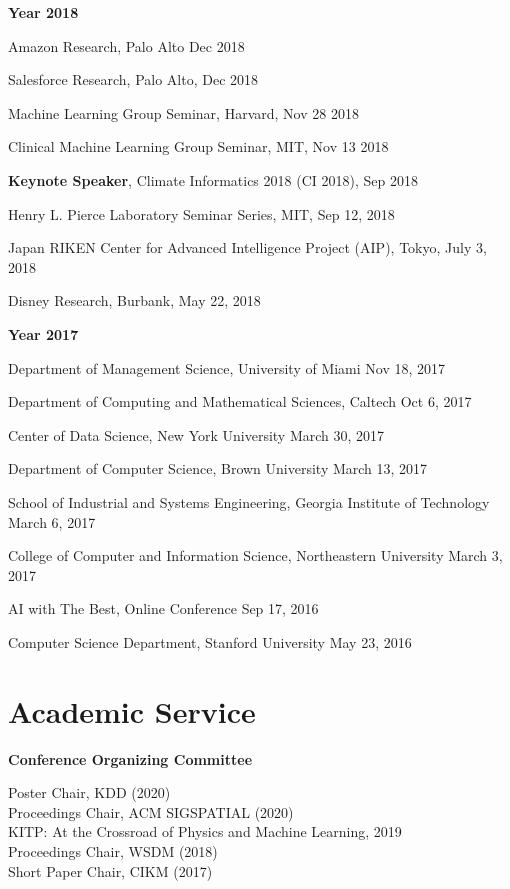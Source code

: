 \documentclass[margin,line]{res}
\begin{document}
\begin{resume}
 {\bf Year  2018}
 
Amazon Research, Palo Alto \hfill{Dec 2018}

Salesforce Research, Palo Alto, \hfill{Dec 2018}

Machine Learning Group Seminar, Harvard, \hfill {Nov 28 2018} 

Clinical Machine Learning Group Seminar, MIT, \hfill {Nov 13  2018} 


\textbf{Keynote Speaker},  Climate Informatics 2018 (CI 2018), \hfill {Sep 2018} 


Henry L. Pierce Laboratory Seminar Series, MIT, \hfill {Sep 12, 2018}

Japan RIKEN  Center for Advanced Intelligence Project (AIP), Tokyo, \hfill {July 3, 2018}

Disney Research, Burbank, \hfill {May 22, 2018}

 {\bf Year  2017}
 
Department of Management Science,  University of Miami  \hfill {Nov 18, 2017}


Department of Computing and Mathematical Sciences,  Caltech  \hfill {Oct 6, 2017}


Center of Data Science, New York University  \hfill {March 30, 2017}


Department of Computer Science, Brown University   \hfill {March 13, 2017}



School of Industrial and Systems Engineering, Georgia Institute of Technology  \hfill {March 6, 2017}


College of Computer and Information Science, Northeastern University  \hfill {March 3, 2017}


 
 AI with The Best, Online Conference \hfill {Sep 17, 2016}
 
 
Computer Science Department,  Stanford University  \hfill {May 23, 2016}
 
 


\section{\sc Academic Service}


{\bf Conference Organizing Committee}

Poster Chair, KDD (2020) \\
Proceedings Chair, ACM SIGSPATIAL (2020) \\
KITP: At the Crossroad of Physics and Machine Learning,  2019\\
Proceedings Chair, WSDM (2018)\\
Short Paper Chair, CIKM (2017)


\end{resume}
\end{document}
